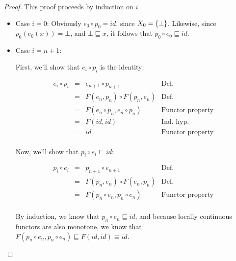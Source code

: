 \begin{proof}
This proof proceeds by induction on $i$. 
\begin{itemize}
\item Case $i=0$: Obviously $e_0 \circ p_0 = id$, since $X_0 = \{{\bot}\}$.  
  Likewise, since $p_0(e_0(x)) = \bot$, and $\bot \sqsubseteq x$, it follows that
  $p_0 \circ e_0 \sqsubseteq id$. 

\item Case $i=n+1$: 

  First, we'll show that $e_i \circ p_i$ is the identity: 

  \begin{displaymath}
    \begin{array}{lcll}
      e_i \circ p_i & = & e_{n+1} \circ p_{n+1}            & \mbox{Def.}\\ 
                    & = & F(e_n, p_n) \circ F(p_n, e_n)   & \mbox{Def.}\\ 
                    & = & F(e_n \circ p_n, e_n \circ p_n) & \mbox{Functor property}\\ 
                    & = & F(id, id)                       & \mbox{Ind. hyp.}\\  
                    & = & id                              & \mbox{Functor property} \\
    \end{array}
  \end{displaymath}

  \noindent Now, we'll show that $p_i \circ e_i \sqsubseteq id$: 

  \begin{displaymath}
    \begin{array}{lcll}
      p_i \circ e_i & = & p_{n+1} \circ e_{n+1}            & \mbox{Def.}\\ 
                    & = & F(p_n, e_n) \circ F(e_n, p_n)   & \mbox{Def.}\\ 
                    & = & F(p_n \circ e_n, p_n \circ e_n) & \mbox{Functor property}\\ 
    \end{array}
  \end{displaymath}

  \noindent By induction, we know that $p_n \circ e_n \sqsubseteq id$, and
  because locally continuous functors are also monotone, we know that 
  $F(p_n \circ e_n, p_n \circ e_n) \sqsubseteq F(id, id) \equiv id$.
\end{itemize}
\end{proof}

